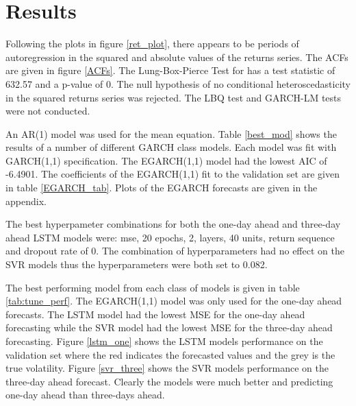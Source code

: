 \documentclass[11pt,preprint, authoryear]{elsarticle}
\numberwithin{equation}{section}
\numberwithin{figure}{section}
\numberwithin{table}{section}
\begin{document}
\hypertarget{results}{%
\section{Results}\label{results}}

Following the plots in figure \ref{ret_plot}, there appears to be
periods of autoregression in the squared and absolute values of the
returns series. The ACFs are given in figure \ref{ACFs}. The
Lung-Box-Pierce Test for has a test statistic of 632.57 and a p-value of
0. The null hypothesis of no conditional heteroscedasticity in the
squared returns series was rejected. The LBQ test and GARCH-LM tests
were not conducted.

\par

An AR(1) model was used for the mean equation. Table \ref{best_mod}
shows the results of a number of different GARCH class models. Each
model was fit with GARCH(1,1) specification. The EGARCH(1,1) model had
the lowest AIC of -6.4901. The coefficients of the EGARCH(1,1) fit to
the validation set are given in table \ref{EGARCH_tab}. Plots of the
EGARCH forecasts are given in the appendix.

\par

The best hyperpameter combinations for both the one-day ahead and
three-day ahead LSTM models were: mse, 20 epochs, 2, layers, 40 units,
return sequence and dropout rate of 0. The combination of
hyperparameters had no effect on the SVR models thus the hyperparameters
were both set to 0.082.

\par

The best performing model from each class of models is given in table
\ref{tab:tune_perf}. The EGARCH(1,1) model was only used for the one-day
ahead forecasts. The LSTM model had the lowest MSE for the one-day ahead
forecasting while the SVR model had the lowest MSE for the three-day
ahead forecasting. Figure \ref{lstm_one} shows the LSTM models
performance on the validation set where the red indicates the forecasted
values and the grey is the true volatility. Figure \ref{svr_three} shows
the SVR models performance on the three-day ahead forecast. Clearly the
models were much better and predicting one-day ahead than three-days
ahead.
\end{document}
